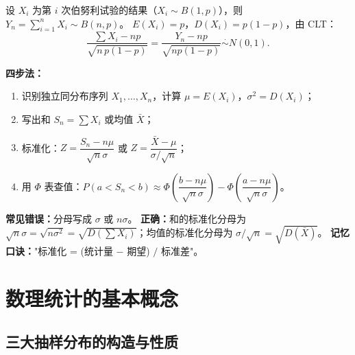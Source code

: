 \documentclass[11pt,a4paper]{article}
\begin{document}
\begin{derivation}
设 $X_i$ 为第 $i$ 次伯努利试验的结果（$X_i\sim B(1,p)$），则 $Y_n=\sum_{i=1}^n X_i\sim B(n,p)$。
$E(X_i)=p$，$D(X_i)=p(1-p)$，由 CLT：
\[
\frac{\sum X_i - np}{\sqrt{n\,p(1-p)}} = \frac{Y_n - np}{\sqrt{np(1-p)}} \overset{\cdot}{\sim} N(0,1).
\]
\end{derivation}

\begin{keypoint}
\textbf{四步法：}
\begin{enumerate}[leftmargin=2em]
  \item 识别独立同分布序列 $X_1,\dots,X_n$，计算 $\mu=E(X_i)$，$\sigma^2=D(X_i)$；
  \item 写出和 $S_n=\sum X_i$ 或均值 $\bar X$；
  \item 标准化：$Z=\dfrac{S_n-n\mu}{\sqrt n\sigma}$ 或 $Z=\dfrac{\bar X-\mu}{\sigma/\sqrt n}$；
  \item 用 $\Phi$ 表查值：$P(a<S_n<b)\approx \Phi\!\left(\dfrac{b-n\mu}{\sqrt n\sigma}\right)-\Phi\!\left(\dfrac{a-n\mu}{\sqrt n\sigma}\right)$。
\end{enumerate}
\end{keypoint}

\begin{examtip}[易错：标准化分母]
\textbf{常见错误：}分母写成 $\sigma$ 或 $n\sigma$。
\textbf{正确：}和的标准化分母为 $\sqrt{n}\sigma=\sqrt{n\sigma^2}=\sqrt{D(\sum X_i)}$；均值的标准化分母为 $\sigma/\sqrt n=\sqrt{D(\bar X)}$。
\textbf{记忆口诀：}"标准化 = (统计量 $-$ 期望) $/$ 标准差"。
\end{examtip}

\section{数理统计的基本概念}

\subsection{三大抽样分布的构造与性质}
\end{document}
